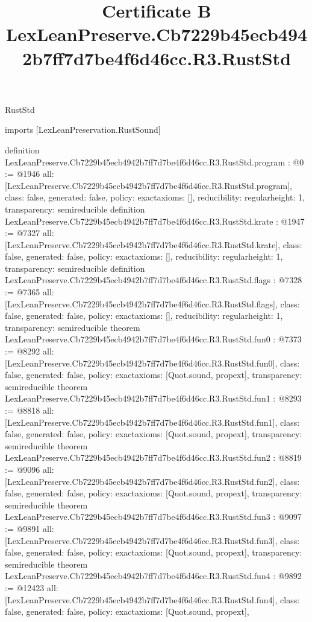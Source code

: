 \begin{lexlean}{RustStd}
\title{Certificate B LexLeanPreserve.Cb7229b45ecb4942b7ff7d7be4f6d46cc.R3.RustStd}
\begin{coremodule}
imports [LexLeanPreservation.RustSound]

definition LexLeanPreserve.Cb7229b45ecb4942b7ff7d7be4f6d46cc.R3.RustStd.program : @0 := @1946 {
  all: [LexLeanPreserve.Cb7229b45ecb4942b7ff7d7be4f6d46cc.R3.RustStd.program],
  class: false,
  generated: false,
  policy: exact{axioms: []},
  reducibility: regular{height: 1},
  transparency: semireducible
}
definition LexLeanPreserve.Cb7229b45ecb4942b7ff7d7be4f6d46cc.R3.RustStd.krate : @1947 := @7327 {
  all: [LexLeanPreserve.Cb7229b45ecb4942b7ff7d7be4f6d46cc.R3.RustStd.krate],
  class: false,
  generated: false,
  policy: exact{axioms: []},
  reducibility: regular{height: 1},
  transparency: semireducible
}
definition LexLeanPreserve.Cb7229b45ecb4942b7ff7d7be4f6d46cc.R3.RustStd.flags : @7328 := @7365 {
  all: [LexLeanPreserve.Cb7229b45ecb4942b7ff7d7be4f6d46cc.R3.RustStd.flags],
  class: false,
  generated: false,
  policy: exact{axioms: []},
  reducibility: regular{height: 1},
  transparency: semireducible
}
theorem LexLeanPreserve.Cb7229b45ecb4942b7ff7d7be4f6d46cc.R3.RustStd.fun0 : @7373 := @8292 {
  all: [LexLeanPreserve.Cb7229b45ecb4942b7ff7d7be4f6d46cc.R3.RustStd.fun0],
  class: false,
  generated: false,
  policy: exact{axioms: [Quot.sound, propext]},
  transparency: semireducible
}
theorem LexLeanPreserve.Cb7229b45ecb4942b7ff7d7be4f6d46cc.R3.RustStd.fun1 : @8293 := @8818 {
  all: [LexLeanPreserve.Cb7229b45ecb4942b7ff7d7be4f6d46cc.R3.RustStd.fun1],
  class: false,
  generated: false,
  policy: exact{axioms: [Quot.sound, propext]},
  transparency: semireducible
}
theorem LexLeanPreserve.Cb7229b45ecb4942b7ff7d7be4f6d46cc.R3.RustStd.fun2 : @8819 := @9096 {
  all: [LexLeanPreserve.Cb7229b45ecb4942b7ff7d7be4f6d46cc.R3.RustStd.fun2],
  class: false,
  generated: false,
  policy: exact{axioms: [Quot.sound, propext]},
  transparency: semireducible
}
theorem LexLeanPreserve.Cb7229b45ecb4942b7ff7d7be4f6d46cc.R3.RustStd.fun3 : @9097 := @9891 {
  all: [LexLeanPreserve.Cb7229b45ecb4942b7ff7d7be4f6d46cc.R3.RustStd.fun3],
  class: false,
  generated: false,
  policy: exact{axioms: [Quot.sound, propext]},
  transparency: semireducible
}
theorem LexLeanPreserve.Cb7229b45ecb4942b7ff7d7be4f6d46cc.R3.RustStd.fun4 : @9892 := @12423 {
  all: [LexLeanPreserve.Cb7229b45ecb4942b7ff7d7be4f6d46cc.R3.RustStd.fun4],
  class: false,
  generated: false,
  policy: exact{axioms: [Quot.sound, propext]},
}
\end{coremodule}
\end{lexlean}
